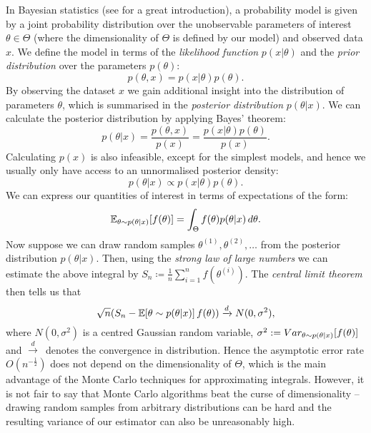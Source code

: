 \documentclass[report.tex]{subfiles}
\begin{document}
In Bayesian statistics (see \citet{gelman2014bayesian} for a great introduction),
a probability model is given by a joint
probability distribution over the unobservable parameters of interest
$\theta \in \Theta$
(where the dimensionality of $\Theta$ is defined by our model)
and observed data $x$.
We define the model in terms of the \textit{likelihood function}
$p(x \vert \theta)$ and the \textit{prior distribution} over the parameters $p(\theta)$:
\begin{equation*}
  p(\theta, x) = p(x \vert \theta)p(\theta).
\end{equation*}
By observing the dataset $x$ we gain additional insight into the distribution of
parameters $\theta$, which is summarised in the \textit{posterior distribution}
$p(\theta \vert x)$.
We can calculate the posterior distribution by applying Bayes' theorem:
\begin{equation*}
  p(\theta \vert x)
  = \frac{p(\theta, x)}{p(x)}
  = \frac{p(x \vert \theta)p(\theta)}{p(x)}.
\end{equation*}
Calculating $p(x)$ is also infeasible, except for the simplest models, and hence
we usually only have access to an unnormalised posterior density:
\begin{equation*}
  p(\theta \vert x) \propto p(x \vert \theta)p(\theta).
\end{equation*}
We can express our quantities of interest in terms of expectations of the form:
\begin{equation*}
  \mathbb{E}_{{\theta \sim p(\theta \vert x)}}\!\left[{f(\theta)}\right]
  = \int_{{\Theta}}^{{}} {f(\theta)p(\theta \vert x)}\, d{\theta}.
\end{equation*}
Now suppose we can draw random samples $\theta^{(1)}, \theta^{(2)}, \dots$
from the posterior distribution $p(\theta \vert x)$.
Then, using the \textit{strong law of large numbers} we can estimate
the above integral by $S_{n} \coloneqq \frac{1}{n} \sum_{i = 1}^{n} f(\theta^{(i)})$.
The \textit{central limit theorem} then tells us that
\begin{equation*}
  \sqrt{n}(S_{n} - \mathbb{E}\!\left[{\theta \sim p(\theta \vert x)}\right]{f(\theta)})
  \xrightarrow[]{d} N(0, \sigma^{2}),
\end{equation*}
where $N(0, \sigma^2)$ is a centred Gaussian random variable,
$\sigma^2 := Var_{{\theta \sim p(\theta \vert x)}}\!\left[{f(\theta)}\right]$
and $\xrightarrow{d}$~denotes the convergence in distribution.
Hence the asymptotic error rate $O(n^{-\frac{1}{2}})$ does not depend
on the dimensionality of $\Theta$, which is the main advantage of the Monte Carlo
techniques for approximating integrals.
However, it is not fair to say that
Monte Carlo algorithms beat the curse of dimensionality --
drawing random samples from arbitrary distributions can be hard and the
resulting variance of our estimator can also be unreasonably high.
\end{document}
